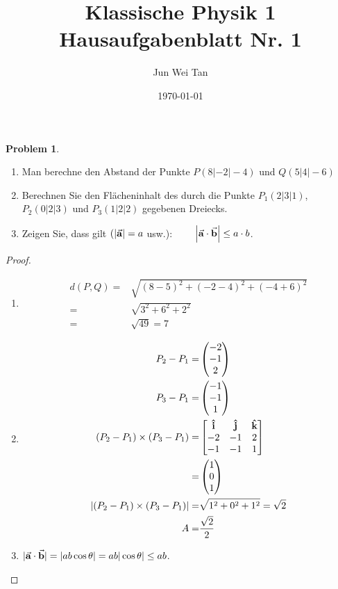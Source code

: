 \documentclass[prb,12pt]{revtex4-2}
\theoremstyle{definition}
\newtheorem{Problem}{Problem}
\theoremstyle{definition}
\newenvironment{parts}{\begin{enumerate}[label=(\alph*)]}{\end{enumerate}}
\begin{document}
	\title{Klassische Physik 1 Hausaufgabenblatt Nr. 1}
	\author{Jun Wei Tan}
	\date{\today}
	\maketitle

\begin{Problem}
	\begin{parts}
		\item Man berechne den Abstand der Punkte $P (8| - 2| - 4)$ und $Q(5|4| - 6)$
		\item Berechnen Sie den Fl\"{a}cheninhalt des durch die Punkte $P_1(2|3|1)$, $P_2(0|2|3)$ und $P_3(1|2|2)$ gegebenen Dreiecks.
		\item Zeigen Sie, dass gilt $(|\va a|=a$ usw.): $\qquad \left| \va a \cdot \va b \right| \le a \cdot b$.
	\end{parts}
\end{Problem}
\begin{proof}
	\begin{parts}
		\item
	\begin{align*}
		d(P, Q)=&\sqrt{(8-5)^2+(-2-4)^2+(-4+6)^2}\\
		=& \sqrt{3^2+6^2+2^2}\\
		=&\sqrt{49} =7
	\end{align*}
\item
	{\allowdisplaybreaks
	\begin{align*}
		P_2-P_1=&\begin{pmatrix} -2 \\ -1 \\ 2 \end{pmatrix} \\
		P_3-P_1=& \begin{pmatrix} -1 \\ -1 \\ 1 \end{pmatrix}\\
		(P_2-P_1)\times (P_3-P_1)=&\begin{bmatrix} \vu i & \vu j & \vu k \\ -2 & -1 & 2 \\ -1 & -1 & 1 \end{bmatrix} \\
		=& \begin{pmatrix} 1 \\ 0 \\ 1 \end{pmatrix}\\
		|(P_2-P_1)\times (P_3-P_1)|=& \sqrt{1^2+0^2+1^2} =\sqrt{2}\\
		A=& \frac{\sqrt{2} }{2}
\end{align*}}
\item $|\va a \cdot \va b|=|ab\cos\theta|=ab|\cos\theta| \le ab$. \qedhere
	\end{parts}
\end{proof}
\end{document}
